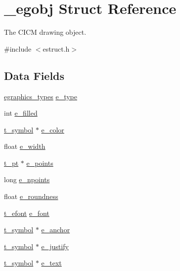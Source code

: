 \hypertarget{struct__egobj}{\section{\-\_\-egobj Struct Reference}
\label{struct__egobj}
}


The C\-I\-C\-M drawing object.  




{\ttfamily \#include $<$estruct.\-h$>$}

\subsection*{Data Fields}
\begin{DoxyCompactItemize}
\item 
\hyperlink{estruct_8h_acc57a0407e8e1eaa69028654742baf3f}{egraphics\-\_\-types} \hyperlink{struct__egobj_a8083c24bd4930af629d483d7bf45a20a}{e\-\_\-type}
\item 
int \hyperlink{struct__egobj_ae13e50cb319a060b3e612c39d0fc698d}{e\-\_\-filled}
\item 
\hyperlink{struct__symbol}{t\-\_\-symbol} $\ast$ \hyperlink{struct__egobj_a13dfb00aea95e0dc5b9d1297260a9280}{e\-\_\-color}
\item 
float \hyperlink{struct__egobj_abe0dac7e3167ea1dd6c4e238ab4ab8bd}{e\-\_\-width}
\item 
\hyperlink{struct__pt}{t\-\_\-pt} $\ast$ \hyperlink{struct__egobj_a579eafd42827c9bdcddc613774309ad3}{e\-\_\-points}
\item 
long \hyperlink{struct__egobj_a216eff6ab0216b35e215bd1c1b8fb0d0}{e\-\_\-npoints}
\item 
float \hyperlink{struct__egobj_ab2c5a6f93a125c4862295e28aad05a74}{e\-\_\-roundness}
\item 
\hyperlink{struct__efont}{t\-\_\-efont} \hyperlink{struct__egobj_a4bf02b4e1a6c0c7723b5ed198f45e0b0}{e\-\_\-font}
\item 
\hyperlink{struct__symbol}{t\-\_\-symbol} $\ast$ \hyperlink{struct__egobj_a26003aea4ac1d50f79a5db2e05599222}{e\-\_\-anchor}
\item 
\hyperlink{struct__symbol}{t\-\_\-symbol} $\ast$ \hyperlink{struct__egobj_a41dc1b542ee19a3171a52480dff2c664}{e\-\_\-justify}
\item 
\hyperlink{struct__symbol}{t\-\_\-symbol} $\ast$ \hyperlink{struct__egobj_a5f97b246c0da885ff0cd44b32a967338}{e\-\_\-text}
\end{DoxyCompactItemize}



